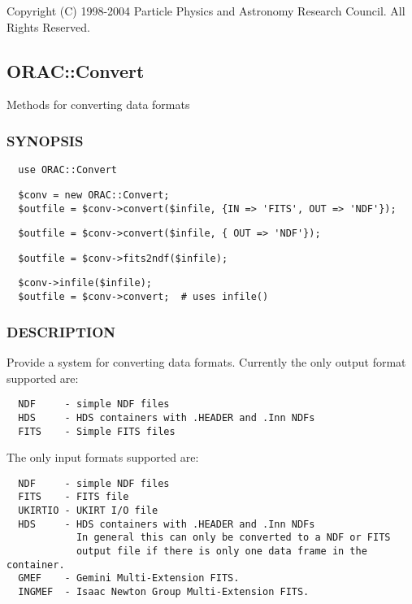 Copyright (C) 1998-2004 Particle Physics and Astronomy Research
Council. All Rights Reserved.

\subsection{ORAC::Convert\label{ORAC::Convert}}


Methods for converting data formats

\subsubsection*{SYNOPSIS\label{ORAC::Convert_SYNOPSIS}}
\begin{verbatim}
  use ORAC::Convert
\end{verbatim}
\begin{verbatim}
  $conv = new ORAC::Convert;
  $outfile = $conv->convert($infile, {IN => 'FITS', OUT => 'NDF'});
\end{verbatim}
\begin{verbatim}
  $outfile = $conv->convert($infile, { OUT => 'NDF'});
\end{verbatim}
\begin{verbatim}
  $outfile = $conv->fits2ndf($infile);
\end{verbatim}
\begin{verbatim}
  $conv->infile($infile);
  $outfile = $conv->convert;  # uses infile()
\end{verbatim}
\subsubsection*{DESCRIPTION\label{ORAC::Convert_DESCRIPTION}}


Provide a system for converting data formats. Currently the
only output format supported are:

\begin{verbatim}
  NDF     - simple NDF files
  HDS     - HDS containers with .HEADER and .Inn NDFs
  FITS    - Simple FITS files
\end{verbatim}


The only input formats supported are:

\begin{verbatim}
  NDF     - simple NDF files
  FITS    - FITS file
  UKIRTIO - UKIRT I/O file
  HDS     - HDS containers with .HEADER and .Inn NDFs
            In general this can only be converted to a NDF or FITS
            output file if there is only one data frame in the container.
  GMEF    - Gemini Multi-Extension FITS.
  INGMEF  - Isaac Newton Group Multi-Extension FITS.
\end{verbatim}


